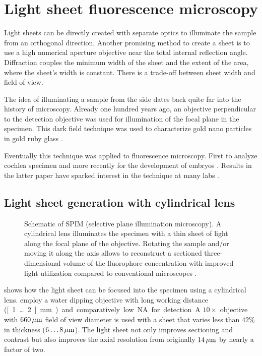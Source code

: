 \section{Light sheet fluorescence microscopy}
\begin{summary}
  Light sheets can be directly created with separate optics to
  illuminate the sample from an orthogonal direction. Another
  promising method to create a sheet is to use a high numerical
  aperture objective near the total internal reflection
  angle. Diffraction couples the minimum width of the sheet and the
  extent of the area, where the sheet's width is constant. There is a
  trade-off between sheet width and field of view.
\end{summary}
The idea of illuminating a sample from the side dates back quite far
into the history of microscopy. Already one hundred years ago, an
objective perpendicular to the detection objective was used for
illumination of the focal plane in the specimen. This dark field
technique was used to characterize gold nano particles in gold ruby
glass \citep{Siedentopf1903}.

Eventually this technique was applied to fluorescence
microscopy. First to analyze cochlea specimen \citep{Voie1993} and
more recently for the development of embryos
\citep{Huisken2004}. Results in the latter paper have sparked interest
in the technique at many labs \citep{Santi2011}.
\subsection{Light sheet generation with cylindrical lens}
\begin{figure}[!hbt]
  \centering
  
  \caption{Schematic of SPIM (selective plane illumination
    microscopy). A cylindrical lens illuminates the specimen with a
    thin sheet of light along the focal plane of the
    objective. Rotating the sample and/or moving it along the axis
    allows to reconstruct a sectioned three-dimensional volume of the
    fluorophore concentration with improved light utilization compared
    to conventional microscopes \citep[inspired from][]{Huisken2004}.}
  \label{fig:spim}
\end{figure}
 shows how the light sheet can be focused into the
specimen using a cylindrical lens. \cite{Huisken2004} employ a water
dipping objective with long working distance (\unit[1\ldots 2]{mm})
and comparatively low NA for detection. A $10\times$ objective with
$\unit[660]{\mu m}$ field of view diameter is used with a sheet that
varies less than $42\%$ in thickness ($\unit[6\ldots 8]{\mu m}$). The
light sheet not only improves sectioning and contrast but also
improves the axial resolution from originally $\unit[14]{\mu m}$ by
nearly a factor of two.

